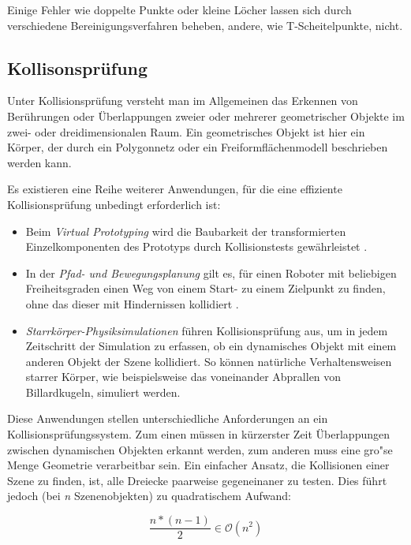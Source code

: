 Einige Fehler wie doppelte Punkte oder kleine L\"ocher lassen sich durch verschiedene Bereinigungsverfahren beheben, andere, wie T-Scheitelpunkte, nicht.

\subsection{Kollisonspr\"ufung}
\label{colGeo}
 
 Unter Kollisionspr\"ufung versteht man im Allgemeinen das Erkennen von Ber\"uhrungen
oder \"Uberlappungen zweier oder mehrerer geometrischer Objekte im zwei- oder dreidimensionalen Raum.
Ein geometrisches Objekt ist hier ein K\"orper, der durch ein Polygonnetz oder
ein Freiformfl\"achenmodell beschrieben werden kann.

Es existieren eine Reihe weiterer Anwendungen, f\"ur die eine effiziente Kollisions\-pr\"ufung
unbedingt erforderlich ist:

\begin{itemize}
	\item Beim {\em Virtual Prototyping} wird die Baubarkeit der transformierten
	Einzelkomponenten des Prototyps durch Kollisionstests gew\"ahrleistet
    \cite{zachmannThesis}.
	\item In der {\em Pfad- und Bewegungsplanung} gilt es, f\"ur einen Roboter mit
	beliebigen Freiheitsgraden einen Weg von einem Start- zu einem Zielpunkt zu
	finden, ohne das dieser mit Hindernissen kollidiert \cite{lavalle}.
	\item {\em Starrk\"orper-Physiksimulationen}  f\"uhren Kollisionspr\"ufung aus,
	um in jedem Zeitschritt der Simulation zu erfassen, ob ein dynamisches Objekt mit einem
	anderen Objekt der Szene kollidiert. So k\"onnen nat\"urliche
	Verhaltensweisen starrer K\"orper, wie beispielsweise das voneinander Abprallen
	von Billardkugeln, simuliert werden.
\end{itemize}

Diese Anwendungen stellen unterschiedliche Anforderungen an ein
Kollisionspr\"ufungssystem. Zum einen m\"ussen in k\"urzerster Zeit \"Uberlappungen
zwischen dynamischen Objekten erkannt werden, zum anderen muss eine
gro"se Menge Geometrie verarbeitbar sein. Ein einfacher Ansatz, die Kollisionen
einer Szene zu finden, ist, alle Dreiecke paarweise gegeneinaner
zu testen. Dies f\"uhrt jedoch (bei  {\em n}
Szenenobjekten) zu quadratischem Aufwand:

\begin{equation}
\frac{n*(n-1)}{2} \in \mathcal O(n^2)\label{quad}
\end{equation}


